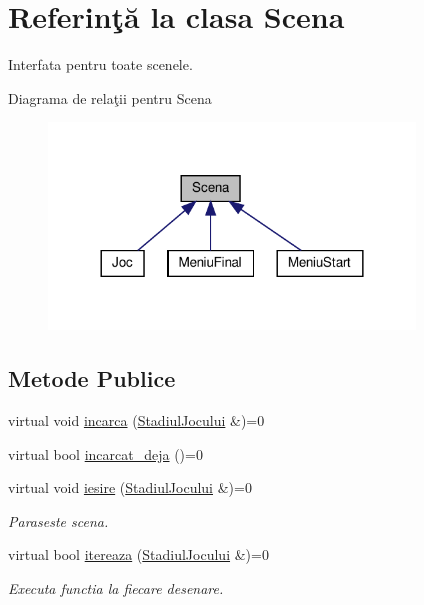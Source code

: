\hypertarget{classScena}{}\section{Referinţă la clasa Scena}
\label{classScena}


Interfata pentru toate scenele.  




Diagrama de relaţii pentru Scena
\nopagebreak
\begin{figure}[H]
\begin{center}
\leavevmode
\includegraphics[width=276pt]{classScena__inherit__graph}
\end{center}
\end{figure}
\subsection*{Metode Publice}
\begin{DoxyCompactItemize}
\item 
virtual void \hyperlink{classScena_a6f53a1dcef68084361dc8f9d56bbb8c0}{incarca} (\hyperlink{classStadiulJocului}{Stadiul\+Jocului} \&)=0
\item 
virtual bool \hyperlink{classScena_ac8de771024795dffa0e5feb8dba881ff}{incarcat\+\_\+deja} ()=0
\item 
\mbox{\label{classScena_a6c1ec6a3ed0acc18f71e9b8a2c077f7a}} 
virtual void \hyperlink{classScena_a6c1ec6a3ed0acc18f71e9b8a2c077f7a}{iesire} (\hyperlink{classStadiulJocului}{Stadiul\+Jocului} \&)=0
\begin{DoxyCompactList}\small\item\em Paraseste scena. \end{DoxyCompactList}\item 
virtual bool \hyperlink{classScena_a9e5fcc831ed410b5b2422231ede746ee}{itereaza} (\hyperlink{classStadiulJocului}{Stadiul\+Jocului} \&)=0
\begin{DoxyCompactList}\small\item\em Executa functia la fiecare \textquotesingle{}desenare\textquotesingle{}. \end{DoxyCompactList}\end{DoxyCompactItemize}



